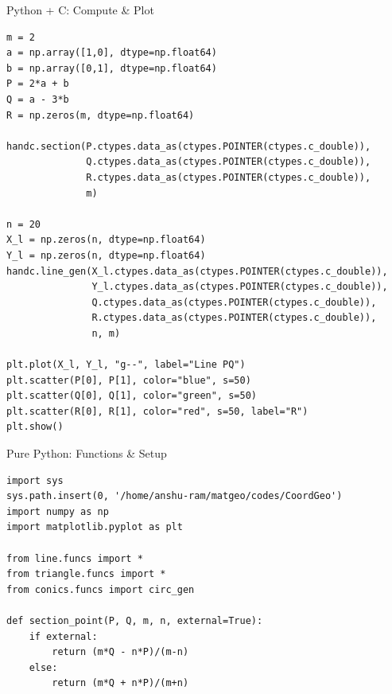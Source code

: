 \documentclass{beamer}
\begin{document}
\begin{frame}[fragile]{Python + C: Compute \& Plot}
\begin{lstlisting}[style=PyStyle]
m = 2
a = np.array([1,0], dtype=np.float64)
b = np.array([0,1], dtype=np.float64)
P = 2*a + b
Q = a - 3*b
R = np.zeros(m, dtype=np.float64)

handc.section(P.ctypes.data_as(ctypes.POINTER(ctypes.c_double)),
              Q.ctypes.data_as(ctypes.POINTER(ctypes.c_double)),
              R.ctypes.data_as(ctypes.POINTER(ctypes.c_double)),
              m)

n = 20
X_l = np.zeros(n, dtype=np.float64)
Y_l = np.zeros(n, dtype=np.float64)
handc.line_gen(X_l.ctypes.data_as(ctypes.POINTER(ctypes.c_double)),
               Y_l.ctypes.data_as(ctypes.POINTER(ctypes.c_double)),
               Q.ctypes.data_as(ctypes.POINTER(ctypes.c_double)),
               R.ctypes.data_as(ctypes.POINTER(ctypes.c_double)),
               n, m)

plt.plot(X_l, Y_l, "g--", label="Line PQ")
plt.scatter(P[0], P[1], color="blue", s=50)
plt.scatter(Q[0], Q[1], color="green", s=50)
plt.scatter(R[0], R[1], color="red", s=50, label="R")
plt.show()
\end{lstlisting}
\end{frame}

\begin{frame}[fragile]{Pure Python: Functions \& Setup}
\begin{lstlisting}[style=PyStyle]
import sys
sys.path.insert(0, '/home/anshu-ram/matgeo/codes/CoordGeo')
import numpy as np
import matplotlib.pyplot as plt

from line.funcs import *
from triangle.funcs import *
from conics.funcs import circ_gen

def section_point(P, Q, m, n, external=True):
    if external:
        return (m*Q - n*P)/(m-n)
    else:
        return (m*Q + n*P)/(m+n)
\end{lstlisting}
\end{frame}
\end{document}
